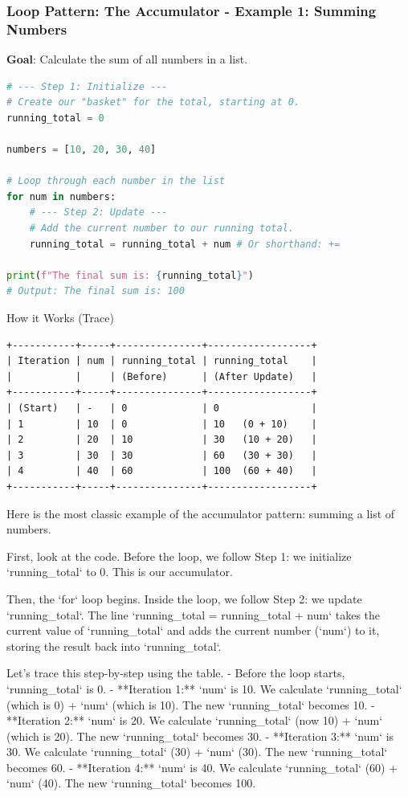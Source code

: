 \documentclass{beamer}
\begin{document}
\begin{frame}[fragile]
    \frametitle{Loop Pattern: The Accumulator - Example 1: Summing Numbers}
    
    \textbf{Goal}: Calculate the sum of all numbers in a list.
    
    \begin{lstlisting}[language=Python, caption=Summing Numbers]
# --- Step 1: Initialize ---
# Create our "basket" for the total, starting at 0.
running_total = 0

numbers = [10, 20, 30, 40]

# Loop through each number in the list
for num in numbers:
    # --- Step 2: Update ---
    # Add the current number to our running total.
    running_total = running_total + num # Or shorthand: +=

print(f"The final sum is: {running_total}")
# Output: The final sum is: 100
    \end{lstlisting}
    
    \begin{block}{How it Works (Trace)}
        \begin{verbatim}
+-----------+-----+---------------+------------------+
| Iteration | num | running_total | running_total    |
|           |     | (Before)      | (After Update)   |
+-----------+-----+---------------+------------------+
| (Start)   | -   | 0             | 0                |
| 1         | 10  | 0             | 10   (0 + 10)    |
| 2         | 20  | 10            | 30   (10 + 20)   |
| 3         | 30  | 30            | 60   (30 + 30)   |
| 4         | 40  | 60            | 100  (60 + 40)   |
+-----------+-----+---------------+------------------+
        \end{verbatim}
    \end{block}
    
    \begin{note}
    Here is the most classic example of the accumulator pattern: summing a list of numbers.
    
    First, look at the code. Before the loop, we follow Step 1: we initialize `running_total` to 0. This is our accumulator.
    
    Then, the `for` loop begins. Inside the loop, we follow Step 2: we update `running_total`. The line `running_total = running_total + num` takes the current value of `running_total` and adds the current number (`num`) to it, storing the result back into `running_total`.
    
    Let's trace this step-by-step using the table.
    - Before the loop starts, `running_total` is 0.
    - **Iteration 1:** `num` is 10. We calculate `running_total` (which is 0) + `num` (which is 10). The new `running_total` becomes 10.
    - **Iteration 2:** `num` is 20. We calculate `running_total` (now 10) + `num` (which is 20). The new `running_total` becomes 30.
    - **Iteration 3:** `num` is 30. We calculate `running_total` (30) + `num` (30). The new `running_total` becomes 60.
    - **Iteration 4:** `num` is 40. We calculate `running_total` (60) + `num` (40). The new `running_total` becomes 100.
    

\end{note}
\end{frame}
\end{document}
